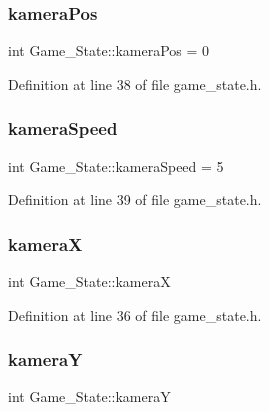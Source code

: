 \subsubsection{\texorpdfstring{kamera\+Pos}{kameraPos}}
{\footnotesize\ttfamily int Game\+\_\+\+State\+::kamera\+Pos = 0\hspace{0.3cm}{\ttfamily [protected]}}



Definition at line 38 of file game\+\_\+state.\+h.

\hypertarget{class_game___state_abbd68113ae4a7ed42d4e600edd857ef1}{}\label{class_game___state_abbd68113ae4a7ed42d4e600edd857ef1} 
\subsubsection{\texorpdfstring{kamera\+Speed}{kameraSpeed}}
{\footnotesize\ttfamily int Game\+\_\+\+State\+::kamera\+Speed = 5\hspace{0.3cm}{\ttfamily [protected]}}



Definition at line 39 of file game\+\_\+state.\+h.

\hypertarget{class_game___state_a24adb6b7cfae8390f484501af0835b3f}{}\label{class_game___state_a24adb6b7cfae8390f484501af0835b3f} 
\subsubsection{\texorpdfstring{kameraX}{kameraX}}
{\footnotesize\ttfamily int Game\+\_\+\+State\+::kameraX\hspace{0.3cm}{\ttfamily [protected]}}



Definition at line 36 of file game\+\_\+state.\+h.

\hypertarget{class_game___state_ad4fc3a4ab3d6caf08cfc8ae92505ebd6}{}\label{class_game___state_ad4fc3a4ab3d6caf08cfc8ae92505ebd6} 
\subsubsection{\texorpdfstring{kameraY}{kameraY}}
{\footnotesize\ttfamily int Game\+\_\+\+State\+::kameraY\hspace{0.3cm}{\ttfamily [protected]}}



